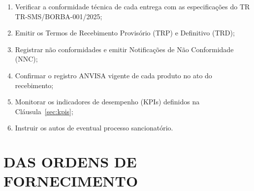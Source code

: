 \documentclass[12pt,a4paper]{article}
\newcommand{\trRef}{TR-SMS/BORBA-001/2025}
\begin{document}
\begin{enumerate}
  \item Verificar a conformidade técnica de cada entrega com as especificações
    do TR \trRef;
  \item Emitir os Termos de Recebimento Provisório (TRP) e Definitivo (TRD);
  \item Registrar não conformidades e emitir Notificações de Não Conformidade (NNC);
  \item Confirmar o registro ANVISA vigente de cada produto no ato do recebimento;
  \item Monitorar os indicadores de desempenho (KPIs) definidos na Cláusula~\ref{sec:kpis};
  \item Instruir os autos de eventual processo sancionatório.
\end{enumerate}

\section{DAS ORDENS DE FORNECIMENTO}
\end{document}
